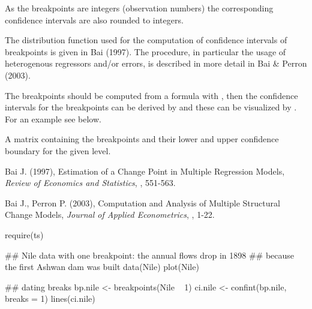 \begin{Details}\relax
As the breakpoints are integers (observation numbers) the corresponding
confidence intervals are also rounded to integers.

The distribution function used for the computation of confidence
intervals of breakpoints is given in Bai (1997). The procedure, in
particular the usage of heterogenous regressors and/or errors, is
described in more detail in Bai \& Perron (2003).

The breakpoints should be computed from a formula with ,
then the confidence intervals for the breakpoints can be derived by
 and these can be visualized by . For an
example see below.\end{Details}
\begin{Value}
A matrix containing the breakpoints and their lower and upper
confidence boundary for the given level.\end{Value}
\begin{References}\relax
Bai J. (1997), Estimation of a Change Point in Multiple Regression Models,
\emph{Review of Economics and Statistics}, , 551-563.

Bai J., Perron P. (2003), Computation and Analysis of Multiple Structural Change
Models, \emph{Journal of Applied Econometrics}, , 1-22.\end{References}
\begin{SeeAlso}\relax
{}\end{SeeAlso}
\begin{Examples}
\begin{ExampleCode}
require(ts)

## Nile data with one breakpoint: the annual flows drop in 1898
## because the first Ashwan dam was built
data(Nile)
plot(Nile)

## dating breaks
bp.nile <- breakpoints(Nile ~ 1)
ci.nile <- confint(bp.nile, breaks = 1)
lines(ci.nile)
\end{ExampleCode}
\end{Examples}

